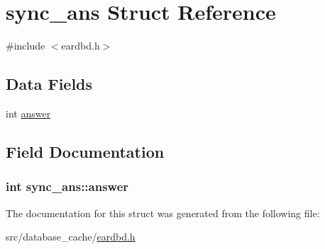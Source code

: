 \hypertarget{structsync__ans}{}\section{sync\+\_\+ans Struct Reference}
\label{structsync__ans}


{\ttfamily \#include $<$eardbd.\+h$>$}

\subsection*{Data Fields}
\begin{DoxyCompactItemize}
\item 
int \hyperlink{structsync__ans_a873505b80233cd710d61447e13de1838}{answer}
\end{DoxyCompactItemize}


\subsection{Field Documentation}
\subsubsection[{\texorpdfstring{answer}{answer}}]{\setlength{\rightskip}{0pt plus 5cm}int sync\+\_\+ans\+::answer}\hypertarget{structsync__ans_a873505b80233cd710d61447e13de1838}{}\label{structsync__ans_a873505b80233cd710d61447e13de1838}


The documentation for this struct was generated from the following file\+:\begin{DoxyCompactItemize}
\item 
src/database\+\_\+cache/\hyperlink{eardbd_8h}{eardbd.\+h}\end{DoxyCompactItemize}
